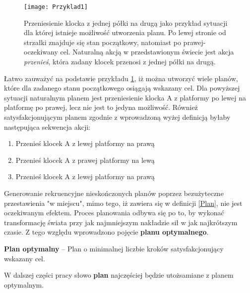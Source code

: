     \begin{figure}[H]
        \texttt{[image: Przyklad1]}
        \centering
        \caption{Przeniesienie klocka z jednej półki na drugą jako przykład sytuacji
        dla której istnieje możliwość utworzenia planu. Po lewej stronie od strzałki znajduje się stan
        początkowy, natomiast po prawej- oczekiwany cel. Naturalną akcją w przedstawionym świecie jest akcja \textit{przenieś}, która
        zadany klocek przenosi z jednej półki na drugą.}
        \label{Przyklad1}
    \end{figure}
    Łatwo zauważyć na podstawie przykładu \ref{Przyklad1}, iż można utworzyć wiele planów, które dla zadanego stanu początkowego 
    osiągają wskazany cel. Dla powyższej sytuacji naturalnym planem jest przeniesienie klocka A z platformy po lewej na platformę po prawej, 
    lecz nie jest to jedyna możliwość. Również satysfakcjonującym planem zgodnie z wprowadzoną wyżej definicją byłaby następująca sekwencja
    akcji:
    \begin{enumerate}
        \item Przenieś klocek A z lewej platformy na prawą
        \item Przenieś klocek A z prawej platformy na lewą
        \item Przenieś klocek A z lewej platformy na prawą
    \end{enumerate}
    Generowanie rekruencyjne nieskończonych planów poprzez bezużyteczne przestawienia "w miejscu", mimo tego, iż zawiera się w definicji \ref{Plan},
    nie jest oczekiwanym efektem. Proces planowania odbywa się po to, by wykonać transformację świata przy jak najmniejszym
    nakładzie sił w jak najkrótszym czasie. Z tego względu wprowadzono pojęcie \textbf{planu optymalnego}.
    \begin{definition}
        \label{PlanOptymalny}
        \textbf{Plan optymalny} -- Plan o minimalnej liczbie kroków satysfakcjonujący wskazany cel. 
    \end{definition}
     
    W dalszej części pracy słowo \textbf{plan} najczęściej będzie utożsamiane z planem optymalnym.
    
